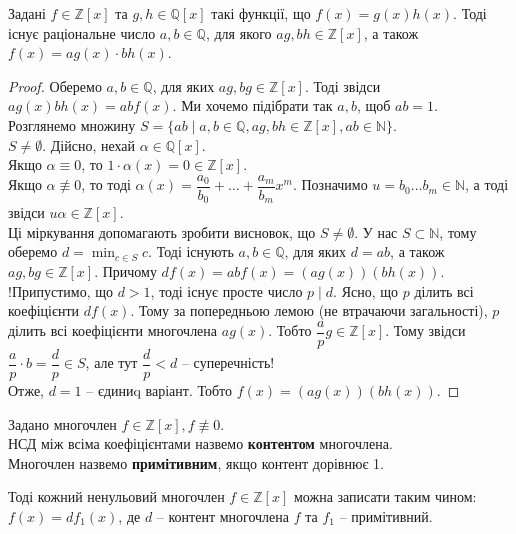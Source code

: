 \documentclass{math_library}
\begin{document}
\begin{lemma}
Задані $f \in \mathbb{Z}[x]$ та $g,h \in \mathbb{Q}[x]$ такі функції, що $f(x) = g(x)h(x)$. Тоді існує раціональне число $a,b \in \mathbb{Q}$, для якого $ag, bh \in \mathbb{Z}[x]$, а також $f(x) = ag(x) \cdot bh(x)$.
\end{lemma}

\begin{proof}
Оберемо $a,b \in \mathbb{Q}$, для яких $ag, bg \in \mathbb{Z}[x]$. Тоді звідси $a g(x) b h(x) = ab f(x)$. Ми хочемо підібрати так $a,b$, щоб $ab = 1$.\\
Розглянемо множину $S = \{ ab \mid a,b \in \mathbb{Q}, ag, bh \in \mathbb{Z}[x], ab \in \mathbb{N}\}$.\\
$S \neq \emptyset$. Дійсно, нехай $\alpha \in \mathbb{Q}[x]$.\\
Якщо $\alpha \equiv 0$, то $1 \cdot \alpha(x) = 0 \in \mathbb{Z}[x]$.\\
Якщо $\alpha \not\equiv 0$, то тоді $\alpha(x) = \dfrac{a_0}{b_0} + \dots + \dfrac{a_m}{b_m}x^m$. Позначимо $u = b_0 \dots b_m \in \mathbb{N}$, а тоді звідси $u \alpha \in \mathbb{Z}[x]$.\\
Ці міркування допомагають зробити висновок, що $S \neq \emptyset$. У нас $S \subset \mathbb{N}$, тому оберемо $d = \displaystyle\min_{c \in S} c$. Тоді існують $a,b \in \mathbb{Q}$, для яких $d = ab$, а також $ag,bg \in \mathbb{Z}[x]$. Причому $df(x) = abf(x) = (ag(x))(bh(x))$.\\
!Припустимо, що $d > 1$, тоді існує просте число $p \mid d$. Ясно, що $p$ ділить всі коефіцієнти $df(x)$. Тому за попередньою лемою (не втрачаючи загальності), $p$ ділить всі коефіцієнти многочлена $ag(x)$. Тобто $\dfrac{a}{p} g \in \mathbb{Z}[x]$. Тому звідси $\dfrac{a}{p} \cdot b = \dfrac{d}{p} \in S$, але тут $\dfrac{d}{p} < d$ -- суперечність!\\
Отже, $d = 1$ -- єдиниq варіант. Тобто $f(x) = (ag(x))(bh(x))$.
\end{proof}

\begin{definition}
Задано многочлен $f \in \mathbb{Z}[x], f \not\equiv 0$.\\
НСД між всіма коефіцієнтами назвемо \textbf{контентом} многочлена.\\
Многочлен назвемо \textbf{примітивним}, якщо контент дорівнює 1.
\end{definition}

Тоді кожний ненульовий многочлен $f \in \mathbb{Z}[x]$ можна записати таким чином:\\ 
$f(x) = d f_1(x)$, де $d$ -- контент многочлена $f$ та $f_1$ -- примітивний.
\end{document}
